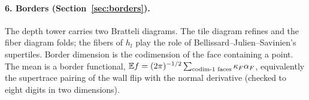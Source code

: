 \paragraph{6. Borders (Section~\ref{sec:borders}).} The depth tower carries two Bratteli diagrams. The tile diagram refines and the fiber
diagram folds; the fibers of $h_l$ play the role of Bellissard--Julien--Savinien's supertiles. Border dimension is the codimension of the
face containing a point. The mean is a border functional, $\mathbb E f=(2\pi)^{-1/2}\sum_{\text{codim-1 faces}}\kappa_F\alpha_F$, equivalently the
supertrace pairing of the wall flip with the normal derivative (checked to eight digits in two dimensions).
